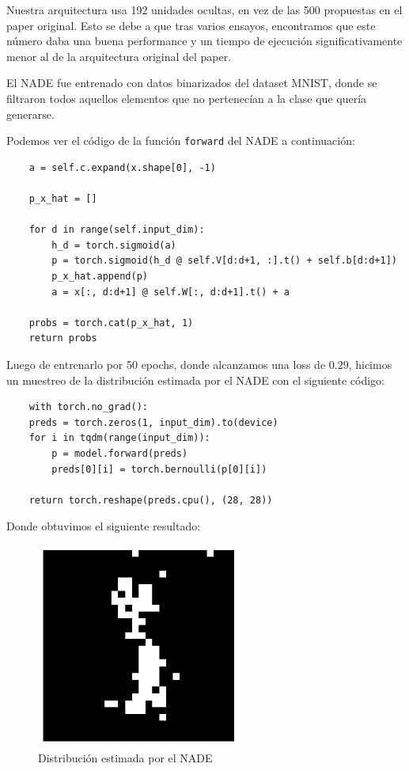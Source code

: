 \documentclass[11pt]{article}
\begin{document}
Nuestra arquitectura usa 192 unidades ocultas, en vez de las 500 propuestas en el paper original. Esto se debe a que tras varios ensayos, encontramos que este número daba una buena performance y un tiempo de ejecución significativamente menor al de la arquitectura original del paper. 

El NADE fue entrenado con datos binarizados del dataset MNIST, donde se filtraron todos aquellos elementos que no pertenecían a la clase que quería generarse.

Podemos ver el código de la función \texttt{forward} del NADE a continuación:

\begin{verbatim}
    a = self.c.expand(x.shape[0], -1)

    p_x_hat = []

    for d in range(self.input_dim):
        h_d = torch.sigmoid(a)
        p = torch.sigmoid(h_d @ self.V[d:d+1, :].t() + self.b[d:d+1])
        p_x_hat.append(p)
        a = x[:, d:d+1] @ self.W[:, d:d+1].t() + a

    probs = torch.cat(p_x_hat, 1)
    return probs
\end{verbatim}

Luego de entrenarlo por 50 epochs, donde alcanzamos una loss de $0.29$, hicimos un muestreo de la distribución estimada por el NADE con el siguiente código:
\begin{verbatim}
    with torch.no_grad():
    preds = torch.zeros(1, input_dim).to(device)
    for i in tqdm(range(input_dim)):
        p = model.forward(preds)
        preds[0][i] = torch.bernoulli(p[0][i])

    return torch.reshape(preds.cpu(), (28, 28))
\end{verbatim}
Donde obtuvimos el siguiente resultado:

\begin{figure}[h]
    \centering
    \includegraphics[width=0.6\textwidth]{NADE/nade_generation.png}
    \caption{Distribución estimada por el NADE}
    \label{fig:nade_gen}
\end{figure}
\end{document}
